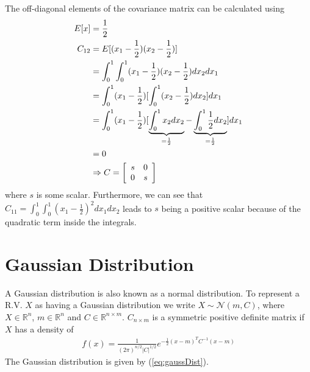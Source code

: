 \documentclass[lecture,12pt,]{pcms-l}
\theoremstyle{example}
\begin{document}
The off-diagonal elements of the covariance matrix can be calculated using
\begin{align*}
E[x] &= \frac{1}{2} \\
C_{12} &= E[(x_1 - \frac{1}{2})(x_2 - \frac{1}{2})] \\
&= \int_0^1 \int_0^1 (x_1 - \frac{1}{2})(x_2 - \frac{1}{2})dx_2dx_1 \\
&= \int_0^1 (x_1 - \frac{1}{2})[\int_0^1 (x_2 - \frac{1}{2})dx_2]dx_1 \\
&= \int_0^1 (x_1 - \frac{1}{2})[\underbrace{\int_0^1 x_2dx_2}_{= \frac{1}{2}} - \underbrace{\int_0^1 \frac{1}{2}dx_2}_{= \frac{1}{2}}]dx_1 \\
&= 0 \\
&\Rightarrow C = \left[\begin{array}{c c}
                         s & 0 \\ 0 & s
                       \end{array}\right]
\end{align*}
where $s$ is some scalar. Furthermore, we can see that \\
$C_{11} = \int_0^1\int_0^1(x_1-\frac{1}{2})^2dx_1dx_2$ leads to $s$ being a positive scalar because of the quadratic term inside the integrals.

\section{Gaussian Distribution}
A Gaussian distribution is also known as a normal distribution. To represent a R.V. $X$ as having a Gaussian distribution we write $X \sim \mathcal{N}(m,C)$, where $X \in \mathbb{R}^n$, $m \in \mathbb{R}^n$ and $C \in \mathbb{R}^{n \times m}$. $C_{n \times m}$ is a symmetric positive definite matrix if $X$ has a density of
\begin{align}
\label{eq:gaussDist}
f(x) = \frac{1}{(2\pi)^{n/2}|C|^{1/2}}e^{-\frac{1}{2}(x-m)^TC^{-1}(x-m)}
\end{align}
The Gaussian distribution is given by (\ref{eq:gaussDist}).
\end{document}
